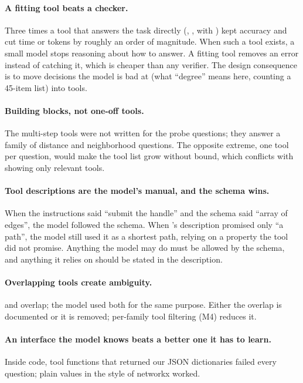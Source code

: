 \paragraph{A fitting tool beats a checker.} Three times a tool that answers the task directly (,
,  with ) kept accuracy and cut time or tokens by roughly an order
of magnitude. When such a tool exists, a small model stops reasoning about how to answer. A fitting tool removes an
error instead of catching it, which is cheaper than any verifier. The design consequence is to move decisions the
model is bad at (what ``degree'' means here, counting a 45-item list) into tools.

\paragraph{Building blocks, not one-off tools.} The multi-step tools were not written for the probe questions; they
answer a family of distance and neighborhood questions. The opposite extreme, one tool per question, would make the
tool list grow without bound, which conflicts with showing only relevant tools.

\paragraph{Tool descriptions are the model's manual, and the schema wins.} When the instructions said ``submit the
handle'' and the schema said ``array of edges'', the model followed the schema. When 's description
promised only ``a path'', the model still used it as a shortest path, relying on a property the tool did not promise.
Anything the model may do must be allowed by the schema, and anything it relies on should be stated in the
description.

\paragraph{Overlapping tools create ambiguity.}  and  overlap; the model used both
for the same purpose. Either the overlap is documented or it is removed; per-family tool filtering (M4) reduces it.

\paragraph{An interface the model knows beats a better one it has to learn.} Inside code, tool functions that returned
our JSON dictionaries failed every question; plain values in the style of networkx worked.

